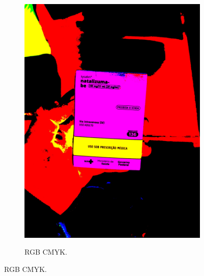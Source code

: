 \begin{figure}[htb]
\begin{subfigure}[b]{0.21\textwidth}
        \includegraphics[width=\linewidth]{../pictures/tysabri_cmyk_thresh_boxes.jpg}
    \end{subfigure}
    \hfill
    \begin{subfigure}[b]{0.21\textwidth}
        \centering
        \caption{RGB CMYK.}
        \label{fig:foto:versoes:2:RGB_CMYK:boxes}

\end{subfigure}
\end{figure}
